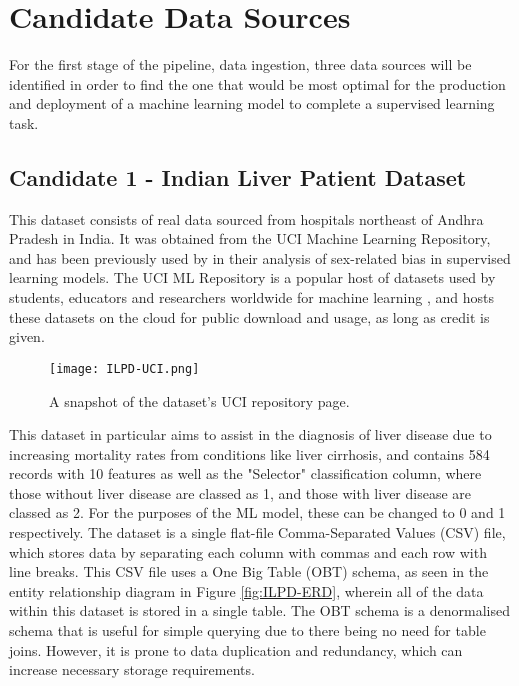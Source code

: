 \chapter{Candidate Data Sources}
For the first stage of the pipeline, data ingestion, three data sources will be identified in order to find 
the one that would be most optimal for the production and deployment of a machine learning model to complete 
a supervised learning task.

\section{Candidate 1 - Indian Liver Patient Dataset}
This dataset \autocite{bendi_ramana_ilpd_2022} consists of real data sourced from hospitals northeast of Andhra Pradesh in India. It was obtained from the
UCI Machine Learning Repository, and has been previously used by \textcite{straw_investigating_2022} in their analysis of sex-related bias in supervised learning models. The UCI ML Repository is a popular host of datasets used by students, 
educators and researchers worldwide for machine learning \autocite{uci_machine_learning_repository_about_nodate}, and hosts these datasets 
on the cloud for public download and usage, as long as credit is given.

\begin{figure}[H]
    \centering
    \texttt{[image: ILPD-UCI.png]}
    \caption{A snapshot of the dataset's UCI repository page.}
    \label{fig:ILPD-UCI}
\end{figure}

This dataset in particular aims to assist in the diagnosis of liver
disease due to increasing mortality rates from conditions like liver cirrhosis, and contains 584 records with 10 features
as well as the "Selector" classification column, where those without liver disease are classed as 1, and those with liver disease 
are classed as 2. For the purposes of the ML model, these can be changed to 0 and 1 respectively. 
The dataset is a single flat-file Comma-Separated Values (CSV) file, which stores data by separating each column with commas
and each row with line breaks. This CSV file uses a One Big Table (OBT) schema, as seen in the entity relationship diagram 
in Figure \ref{fig:ILPD-ERD}, wherein all of the data within this dataset is stored in a single table. 
The OBT schema is a denormalised schema that is useful for simple querying due to there being no need for table joins. 
However, it is prone to data duplication and redundancy, which can increase necessary storage requirements.

